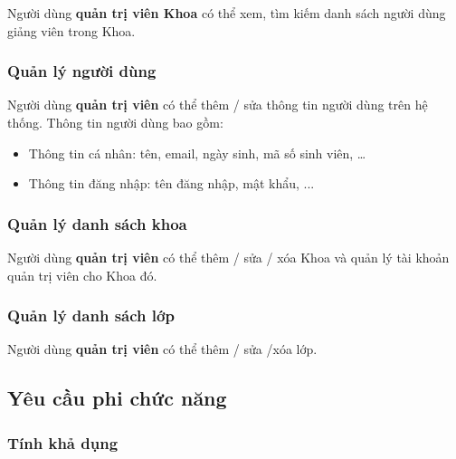 \documentclass[./../main.tex]{subfiles}
\begin{document}
Người dùng \textbf{quản trị viên Khoa} có thể xem, tìm kiếm danh sách
người dùng giảng viên trong Khoa.
  
\hypertarget{quux1ea3n-luxfd-ngux1b0ux1eddi-duxf9ng}{%
	\subsubsection{Quản lý người
		dùng}\label{quux1ea3n-luxfd-ngux1b0ux1eddi-duxf9ng}}
  
Người dùng \textbf{quản trị viên} có thể thêm / sửa thông tin người dùng
trên hệ thống. Thông tin người dùng bao gồm:
  
\begin{itemize}
	\item
	      
	      	Thông tin cá nhân: tên, email, ngày sinh, mã số sinh viên, \ldots{}
	      
	\item
	      
	      	Thông tin đăng nhập: tên đăng nhập, mật khẩu, ...
	      
\end{itemize}
  
\hypertarget{quux1ea3n-luxfd-danh-suxe1ch-khoa}{%
	\subsubsection{Quản lý danh sách
		khoa}\label{quux1ea3n-luxfd-danh-suxe1ch-khoa}}
  
Người dùng \textbf{quản trị viên} có thể thêm / sửa / xóa Khoa và quản
lý tài khoản quản trị viên cho Khoa đó.
  
\hypertarget{quux1ea3n-luxfd-danh-suxe1ch-lux1edbp}{%
	\subsubsection{Quản lý danh sách
		lớp}\label{quux1ea3n-luxfd-danh-suxe1ch-lux1edbp}}
  
Người dùng \textbf{quản trị viên} có thể thêm / sửa /xóa lớp.

\subsection{Yêu cầu phi chức năng}

\hypertarget{tuxednh-khux1ea3-dux1ee5ng}{%
	\subsubsection{Tính khả dụng}\label{tuxednh-khux1ea3-dux1ee5ng}}
\end{document}
